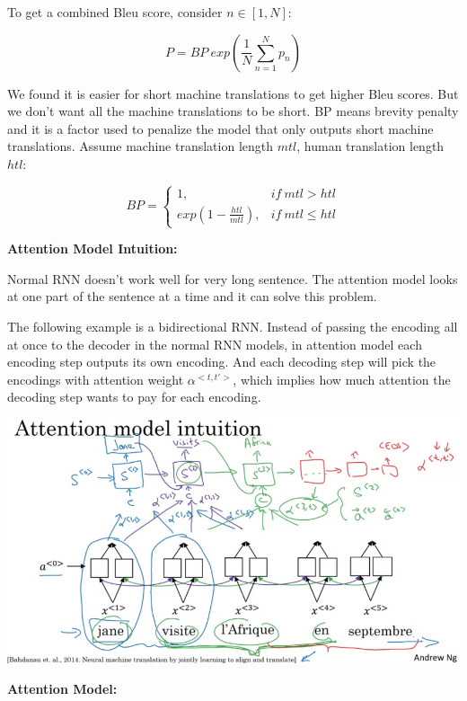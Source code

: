 \documentclass{article}
\begin{document}
\noindent To get a combined Bleu score, consider \(n \in [1, N]\):

\[P = BP \ exp(\frac{1}{N} \sum_{n = 1}^{N} p_{n})\]

\noindent We found it is easier for short machine translations to get higher Bleu scores. But we don't want all the machine translations to be short. BP means brevity penalty and it is a factor used to penalize the model that only outputs short machine translations. Assume machine translation length \(mtl\), human translation length \(htl\):

\[
BP = 
\begin{cases}
    1, & if \ mtl > htl \\
    exp(1 - \frac{htl}{mtl}), & if \ mtl \leq htl
\end{cases}
\]

\noindent \textbf{Attention Model Intuition:}

\noindent Normal RNN doesn't work well for very long sentence. The attention model looks at one part of the sentence at a time and it can solve this problem.

\bigskip

\noindent The following example is a bidirectional RNN. Instead of passing the encoding all at once to the decoder in the normal RNN models, in attention model each encoding step outputs its own encoding. And each decoding step will pick the encodings with attention weight \(\alpha^{<t, t'>}\), which implies how much attention the decoding step wants to pay for each encoding.

\begin{center}
\includegraphics[scale=0.3]{./images/attention_model_intuition.png}
\end{center}

\noindent \textbf{Attention Model:}
\end{document}
